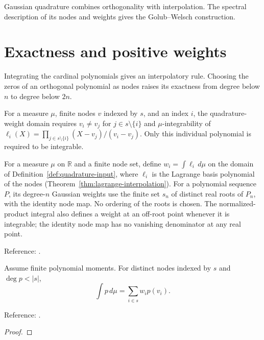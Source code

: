 
Gaussian quadrature combines orthogonality with interpolation. The spectral description of its nodes and weights gives the Golub--Welsch construction.

\section{Exactness and positive weights}\label{sec:textbook-gauss-gauss}

Integrating the cardinal polynomials gives an interpolatory rule. Choosing the zeros of an orthogonal polynomial as nodes raises its exactness from degree below $n$ to degree below $2n$.

\begin{definition}
\label{def:quadrature-input}
\leanok
For a measure $\mu$, finite nodes $v$ indexed by $s$, and an index $i$,
the quadrature-weight domain requires $v_i\ne v_j$ for
$j\in s\setminus\{i\}$ and $\mu$-integrability of
$\ell_i(X)=\prod_{j\in s\setminus\{i\}}(X-v_j)/(v_i-v_j)$.
Only this individual polynomial is required to be integrable.
\end{definition}

\begin{definition}
\label{def:quadrature-weights}
\leanok
For a measure $\mu$ on $\mathbb R$ and a finite node set, define
$w_i=\int\ell_i\,d\mu$ on the domain of Definition~\ref{def:quadrature-input}, where $\ell_i$ is the Lagrange basis polynomial of the nodes
(Theorem~\ref{thm:lagrange-interpolation}).
For a polynomial sequence $P$, its degree-$n$ Gaussian weights use the finite
set $s_n$ of distinct real roots of $P_n$, with the identity node map.
No ordering of the roots is chosen. The normalized-product integral also
defines a weight at an off-root point whenever it is integrable; the identity
node map has no vanishing denominator at any real point.

Reference: \cite[3.5(iv)--(v)]{dlmf}.
\end{definition}

\begin{theorem}
\label{thm:interpolatory-quadrature}
\leanok
Assume finite polynomial moments. For distinct nodes indexed by $s$ and
$\deg p<|s|$,
\[
 \int p\,d\mu=\sum_{i\in s}w_i p(v_i).
\]

Reference: \cite[3.5(iv)]{dlmf}.
\end{theorem}
\begin{proof}
\leanok
\end{proof}

